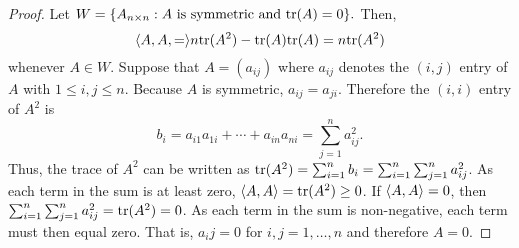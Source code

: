 \documentclass[../AlgebraQualSolutions.tex]{subfiles}
\begin{document}
    \begin{proof}
        Let $W = \{A_{n\times n}: A \textrm{ is symmetric  and } \mathrm{tr}(A) = 0\}.$ Then,
            \[\langle A,A, =\rangle n\mathrm{tr}(A^2) - \mathrm{tr}(A)\mathrm{tr}(A) = n\mathrm{tr}(A^2)\]
        whenever $A \in W$. Suppose that $A = (a_{ij})$ where $a_{ij}$ denotes the $(i,j)$ entry of $A$ with $1\leq i,j \leq n$. Because $A$ is symmetric, $a_{ij} = a_{ji}$. Therefore the $(i,i)$ entry of $A^2$ is
            \[b_i = a_{i1}a_{1i} + \cdots + a_{in}a_{ni} = \sum_{j=1}^n a_{ij}^2. \]
        Thus, the trace of $A^2$ can be written as $\mathrm{tr}(A^2) = \sum_{i=1}^n b_i = \sum_{i=1}^n \sum_{j=1}^n a_{ij}^2$. As each term in the sum is at least zero, $\langle A, A\rangle = \mathrm{tr}(A^2) \geq 0$. If $\langle A, A\rangle = 0$, then $\sum_{i=1}^n \sum_{j=1}^n a_{ij}^2 = \mathrm{tr}(A^2) = 0$. As each term in the sum is non-negative, each term must then equal zero. That is, $a_ij = 0$ for $i,j = 1, \ldots, n$ and therefore $A = 0$.
    \end{proof}
\end{document}
